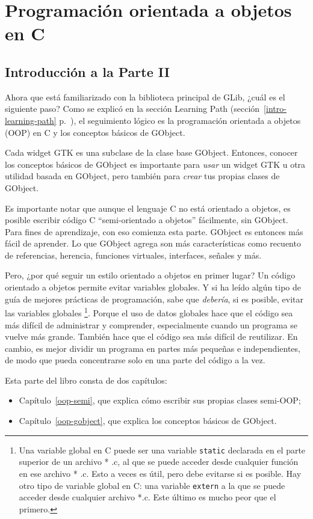 \part{Programación orientada a objetos en C\label{oop}}

\chapter*{Introducción a la Parte II}
\setcounter{footnote}{0}

Ahora que está familiarizado con la biblioteca principal de GLib, ¿cuál es el siguiente paso? Como se explicó en la sección Learning Path (sección~\ref{intro-learning-path} p.~\pageref{intro-learning-path}), el seguimiento lógico es la programación orientada a objetos (OOP) en C y los conceptos básicos de GObject.

Cada widget GTK es una subclase de la clase base GObject. Entonces, conocer los conceptos básicos de GObject es importante para \emph{usar} un widget GTK u otra utilidad basada en GObject, pero también para \emph{crear} tus propias clases de GObject.

Es importante notar que aunque el lenguaje C no está orientado a objetos, es posible escribir código C ``semi-orientado a objetos'' fácilmente, sin GObject. Para fines de aprendizaje, con eso comienza esta parte. GObject es entonces más fácil de aprender. Lo que GObject agrega son más características como recuento de referencias, herencia, funciones virtuales, interfaces, señales y más.

Pero, ¿por qué seguir un estilo orientado a objetos en primer lugar? Un código orientado a objetos permite evitar variables globales. Y si ha leído algún tipo de guía de mejores prácticas de programación, sabe que \emph{debería}, si es posible, evitar las variables globales \footnote{Una variable global en C puede ser una variable \lstinline{static} declarada en el parte superior de un archivo * .c, al que se puede acceder desde cualquier función en ese archivo * .c. Esto a veces es útil, pero debe evitarse si es posible. Hay otro tipo de variable global en C: una variable \lstinline{extern} a la que se puede acceder desde cualquier archivo *.c. Este último es mucho peor que el primero.}. Porque el uso de datos globales hace que el código sea más difícil de administrar y comprender, especialmente cuando un programa se vuelve más grande. También hace que el código sea más difícil de reutilizar. En cambio, es mejor dividir un programa en partes más pequeñas e independientes, de modo que pueda concentrarse solo en una parte del código a la vez.

Esta parte del libro consta de dos capítulos:
\begin{itemize}
    \item Capítulo~\ref{oop-semi}, que explica cómo escribir sus propias clases semi-OOP;
    \item Capítulo~\ref{oop-gobject}, que explica los conceptos básicos de GObject.
\end{itemize}